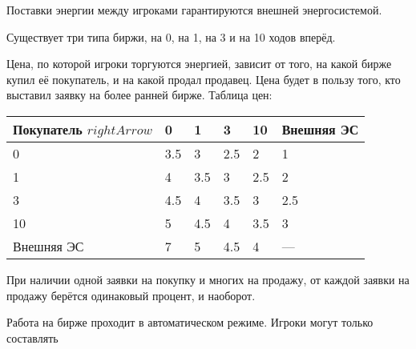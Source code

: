 Поставки энергии между игроками гарантируются внешней энергосистемой.

Существует три типа биржи, на 0, на 1, на 3 и на 10 ходов вперёд.

Цена, по которой игроки торгуются энергией, зависит от того, на какой бирже купил её покупатель, и на какой продал продавец. Цена будет в пользу того, кто выставил заявку на более ранней бирже. Таблица цен:

\begin{tabular}{|l|l|l|l|l|l|}
    \hline
    Покупатель $rightArrow$ & 0 & 1 & 3 & 10 & Внешняя ЭС \\
    \hline
    0 & 3.5 & 3 & 2.5 & 2 & 1 \\
    \hline
    1 & 4 & 3.5 & 3 & 2.5 & 2 \\
    \hline
    3 & 4.5 & 4 & 3.5 & 3 & 2.5 \\
    \hline
    10 & 5 & 4.5 & 4 & 3.5 & 3 \\
    \hline
    Внешняя ЭС & 7 & 5 & 4.5 & 4 & — \\ 
    \hline   
\end{tabular}

При наличии одной заявки на покупку и многих на продажу, от каждой заявки на продажу берётся одинаковый процент, и наоборот.

Работа на бирже проходит в автоматическом режиме. Игроки могут только составлять 

